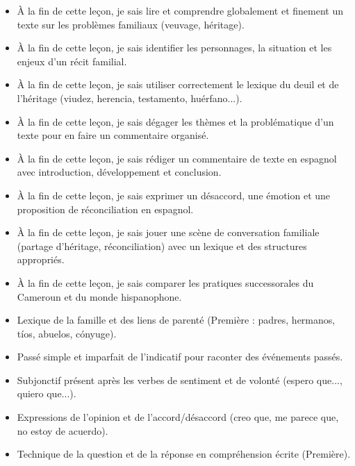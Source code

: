 \documentclass[11pt]{article}
\begin{document}
\begin{objectifs}
\begin{itemize}
\item À la fin de cette leçon, je sais lire et comprendre globalement et finement un texte sur les problèmes familiaux (veuvage, héritage).
\item À la fin de cette leçon, je sais identifier les personnages, la situation et les enjeux d'un récit familial.
\item À la fin de cette leçon, je sais utiliser correctement le lexique du deuil et de l'héritage (viudez, herencia, testamento, huérfano...).
\item À la fin de cette leçon, je sais dégager les thèmes et la problématique d'un texte pour en faire un commentaire organisé.
\item À la fin de cette leçon, je sais rédiger un commentaire de texte en espagnol avec introduction, développement et conclusion.
\item À la fin de cette leçon, je sais exprimer un désaccord, une émotion et une proposition de réconciliation en espagnol.
\item À la fin de cette leçon, je sais jouer une scène de conversation familiale (partage d'héritage, réconciliation) avec un lexique et des structures appropriés.
\item À la fin de cette leçon, je sais comparer les pratiques successorales du Cameroun et du monde hispanophone.
\end{itemize}
\end{objectifs}

\begin{prerequis}
\begin{itemize}
\item Lexique de la famille et des liens de parenté (Première : padres, hermanos, tíos, abuelos, cónyuge).
\item Passé simple et imparfait de l'indicatif pour raconter des événements passés.
\item Subjonctif présent après les verbes de sentiment et de volonté (espero que..., quiero que...).
\item Expressions de l'opinion et de l'accord/désaccord (creo que, me parece que, no estoy de acuerdo).
\item Technique de la question et de la réponse en compréhension écrite (Première).
\end{itemize}
\end{prerequis}

\newpage
\end{document}
